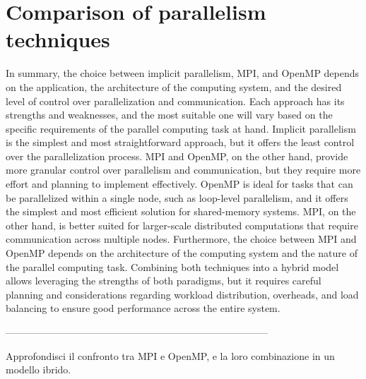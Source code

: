 \section*{\label{sec:comparison}Comparison of parallelism techniques}

In summary, the choice between implicit parallelism, MPI, and OpenMP depends on %
the application, the architecture of the computing system, and the desired level %
of control over parallelization and communication. Each approach has its strengths %
and weaknesses, and the most suitable one will vary based on the specific requirements %
of the parallel computing task at hand.
Implicit parallelism is the simplest and most straightforward approach, but it %
offers the least control over the parallelization process. MPI and OpenMP, on the %
other hand, provide more granular control over parallelism and communication, %
but they require more effort and planning to implement effectively.
OpenMP is ideal for tasks that can be parallelized within a single node, such as %
loop-level parallelism, and it offers the simplest and most efficient solution %
for shared-memory systems. MPI, on the other hand, is better suited for larger-scale %
distributed computations that require communication across multiple nodes. 
Furthermore, the choice between MPI and OpenMP depends on the architecture of the computing %
system and the nature of the parallel computing task.
Combining both techniques into a hybrid model allows leveraging the strengths of both paradigms, %
but it requires careful planning and considerations regarding workload distribution, %
overheads, and load balancing to ensure good performance across the entire system.

--------------------------------------------------------------------------------

Approfondisci il confronto tra MPI e OpenMP, e la loro combinazione in un modello ibrido.\\
